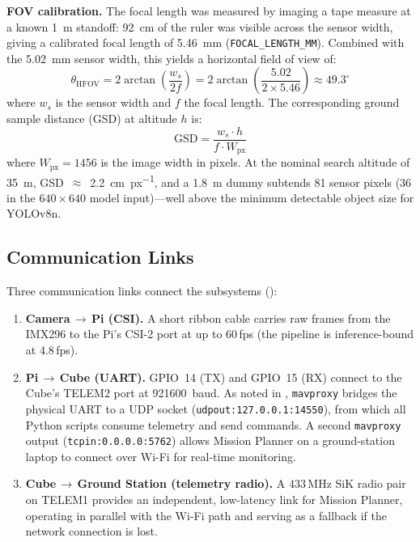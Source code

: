 \textbf{FOV calibration.}
The focal length was measured by imaging a tape measure at a known \SI{1}{\metre} standoff: \SI{92}{\centi\metre} of the ruler was visible across the sensor width, giving a calibrated focal length of \SI{5.46}{\milli\metre} (\texttt{FOCAL\_LENGTH\_MM}). Combined with the \SI{5.02}{\milli\metre} sensor width, this yields a horizontal field of view of:
%
\begin{equation}\label{eq:hfov}
  \theta_{\mathrm{HFOV}} = 2\arctan\!\left(\frac{w_s}{2f}\right)
                         = 2\arctan\!\left(\frac{5.02}{2 \times 5.46}\right)
                         \approx 49.3^{\circ}
\end{equation}
%
where $w_s$ is the sensor width and $f$ the focal length. The corresponding ground sample distance (GSD) at altitude $h$ is:
%
\begin{equation}\label{eq:gsd}
  \mathrm{GSD} = \frac{w_s \cdot h}{f \cdot W_{\mathrm{px}}}
\end{equation}
%
where $W_{\mathrm{px}} = 1456$ is the image width in pixels. At the nominal search altitude of \SI{35}{\metre}, GSD~$\approx$~\SI{2.2}{\centi\metre\per px}, and a \SI{1.8}{\metre} dummy subtends 81 sensor pixels (36 in the $640\!\times\!640$ model input)---well above the minimum detectable object size for YOLOv8n.


\subsection{Communication Links}\label{sec:hw-comms}

Three communication links connect the subsystems ():

\begin{enumerate}[leftmargin=1.4em]
  \item \textbf{Camera\,$\rightarrow$\,Pi (CSI).} A short ribbon cable carries raw frames from the IMX296 to the Pi's CSI-2 port at up to 60\,fps (the pipeline is inference-bound at 4.8\,fps).

  \item \textbf{Pi\,$\rightarrow$\,Cube (UART).} GPIO~14 (TX) and GPIO~15 (RX) connect to the Cube's TELEM2 port at \SI{921600}{baud}. As noted in , \texttt{mavproxy} bridges the physical UART to a UDP socket (\texttt{udpout:127.0.0.1:14550}), from which all Python scripts consume telemetry and send commands. A second \texttt{mavproxy} output (\texttt{tcpin:0.0.0.0:5762}) allows Mission Planner on a ground-station laptop to connect over Wi-Fi for real-time monitoring.

  \item \textbf{Cube\,$\rightarrow$\,Ground Station (telemetry radio).} A 433\,MHz SiK radio pair on TELEM1 provides an independent, low-latency link for Mission Planner, operating in parallel with the Wi-Fi path and serving as a fallback if the network connection is lost.
\end{enumerate}

